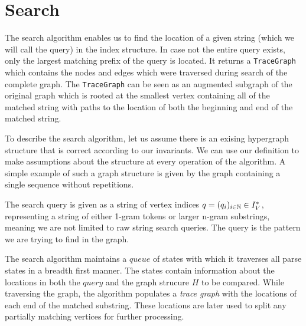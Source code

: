 
\section{Search}

The search algorithm enables us to find the location of a given string (which we will call the query) in the index structure. In case not the entire query exists, only the largest matching prefix of the query is located. It returns a \texttt{TraceGraph} which contains the nodes and edges which were traversed during search of the complete graph. The \texttt{TraceGraph} can be seen as an augmented subgraph of the original graph which is rooted at the smallest vertex containing all of the matched string with paths to the location of both the beginning and end of the matched string.

\noindent To describe the search algorithm, let us assume there is an exising hypergraph structure that is correct according to our invariants. We can use our definition to make assumptions about the structure at every operation of the algorithm. A simple example of such a graph structure is given by the graph containing a single sequence without repetitions.

\noindent The search query is given as a string of vertex indices $q = (q_i)_{i \in \mathbb{N}} \in I_V^*$, representing a string of either 1-gram tokens or larger n-gram substrings, meaning we are not limited to raw string search queries. The query is the pattern we are trying to find in the graph.

\noindent The search algorithm maintains a $queue$ of states with which it traverses all parse states in a breadth first manner. The states contain information about the locations in both the $query$ and the graph strucure $H$ to be compared. While traversing the graph, the algorithm populates a \textit{trace graph} with the locations of each end of the matched substring. These locations are later used to split any partially matching vertices for further processing.


